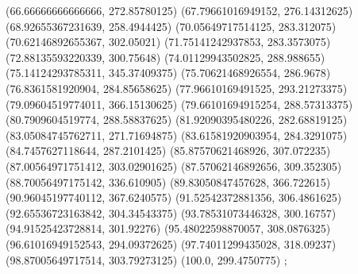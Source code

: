 {{{		(66.66666666666666, 272.85780125)
		(67.79661016949152, 276.14312625)
		(68.92655367231639, 258.4944425)
		(70.05649717514125, 283.312075)
		(70.62146892655367, 302.05021)
		(71.75141242937853, 283.3573075)
		(72.88135593220339, 300.75648)
		(74.01129943502825, 288.988655)
		(75.14124293785311, 345.37409375)
		(75.70621468926554, 286.9678)
		(76.8361581920904, 284.85658625)
		(77.96610169491525, 293.21273375)
		(79.09604519774011, 366.15130625)
		(79.66101694915254, 288.57313375)
		(80.7909604519774, 288.58837625)
		(81.92090395480226, 282.68819125)
		(83.05084745762711, 271.71694875)
		(83.61581920903954, 284.3291075)
		(84.7457627118644, 287.2101425)
		(85.87570621468926, 307.072235)
		(87.00564971751412, 303.02901625)
		(87.57062146892656, 309.352305)
		(88.70056497175142, 336.610905)
		(89.83050847457628, 366.722615)
		(90.96045197740112, 367.6240575)
		(91.52542372881356, 306.4861625)
		(92.65536723163842, 304.34543375)
		(93.78531073446328, 300.16757)
		(94.91525423728814, 301.92276)
		(95.48022598870057, 308.0876325)
		(96.61016949152543, 294.09372625)
		(97.74011299435028, 318.09237)
		(98.87005649717514, 303.79273125)
		(100.0, 299.4750775)
	};

}}

